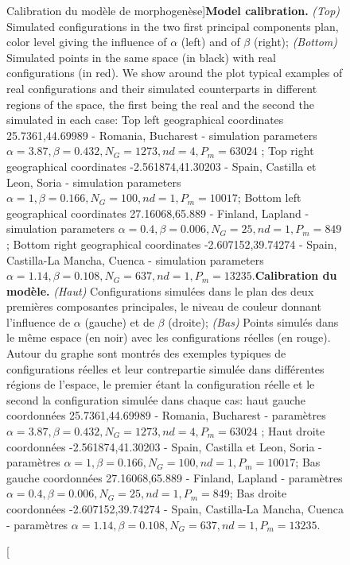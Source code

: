 \begin{figure}
\caption[Model calibration][Calibration du modèle de morphogenèse]{\textbf{Model calibration.} \textit{(Top)} Simulated configurations in the two first principal components plan, color level giving the influence of $\alpha$ (left) and of $\beta$ (right); \textit{(Bottom)} Simulated points in the same space (in black) with real configurations (in red). We show around the plot typical examples of real configurations and their simulated counterparts in different regions of the space, the first being the real and the second the simulated in each case: Top left geographical coordinates 25.7361,44.69989 - Romania, Bucharest - simulation parameters $\alpha=3.87,\beta=0.432,N_G=1273,nd=4,P_m=63024$ ; Top right geographical coordinates -2.561874,41.30203 - Spain, Castilla et Leon, Soria - simulation parameters $\alpha=1,\beta=0.166,N_G=100,nd=1,P_m=10017$; Bottom left geographical coordinates 27.16068,65.889 - Finland, Lapland - simulation parameters $\alpha=0.4,\beta=0.006,N_G=25,nd=1,P_m=849$; Bottom right geographical coordinates -2.607152,39.74274 - Spain, Castilla-La Mancha, Cuenca - simulation parameters $\alpha=1.14,\beta=0.108,N_G=637,nd=1,P_m=13235$.\label{fig:density:densitycalib}}{\textbf{Calibration du modèle.} \textit{(Haut)} Configurations simulées dans le plan des deux premières composantes principales, le niveau de couleur donnant l'influence de $\alpha$ (gauche) et de $\beta$ (droite); \textit{(Bas)} Points simulés dans le même espace (en noir) avec les configurations réelles (en rouge). Autour du graphe sont montrés des exemples typiques de configurations réelles et leur contrepartie simulée dans différentes régions de l'espace, le premier étant la configuration réelle et le second la configuration simulée dans chaque cas: haut gauche coordonnées 25.7361,44.69989 - Romania, Bucharest - paramètres $\alpha=3.87,\beta=0.432,N_G=1273,nd=4,P_m=63024$ ; Haut droite coordonnées -2.561874,41.30203 - Spain, Castilla et Leon, Soria - paramètres $\alpha=1,\beta=0.166,N_G=100,nd=1,P_m=10017$; Bas gauche coordonnées 27.16068,65.889 - Finland, Lapland - paramètres $\alpha=0.4,\beta=0.006,N_G=25,nd=1,P_m=849$; Bas droite coordonnées -2.607152,39.74274 - Spain, Castilla-La Mancha, Cuenca - paramètres $\alpha=1.14,\beta=0.108,N_G=637,nd=1,P_m=13235$.\label{fig:density:densitycalib}}
\end{figure}



